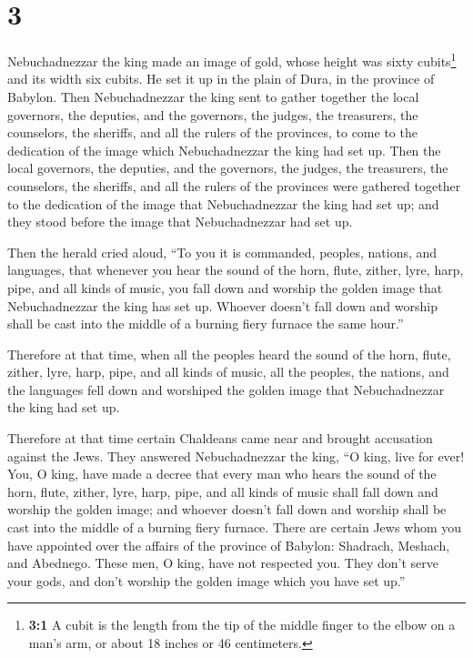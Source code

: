 \hypertarget{section-2}{%
\section{3}\label{section-2}}

 Nebuchadnezzar the king made an image of gold, whose
height was sixty cubits\footnote{\textbf{3:1} A cubit is the length from
  the tip of the middle finger to the elbow on a man's arm, or about 18
  inches or 46 centimeters.} and its width six cubits. He set it up in
the plain of Dura, in the province of Babylon.  Then
Nebuchadnezzar the king sent to gather together the local governors, the
deputies, and the governors, the judges, the treasurers, the counselors,
the sheriffs, and all the rulers of the provinces, to come to the
dedication of the image which Nebuchadnezzar the king had set up.
 Then the local governors, the deputies, and the
governors, the judges, the treasurers, the counselors, the sheriffs, and
all the rulers of the provinces were gathered together to the dedication
of the image that Nebuchadnezzar the king had set up; and they stood
before the image that Nebuchadnezzar had set up.

 Then the herald cried aloud, ``To you it is commanded,
peoples, nations, and languages,  that whenever you hear
the sound of the horn, flute, zither, lyre, harp, pipe, and all kinds of
music, you fall down and worship the golden image that Nebuchadnezzar
the king has set up.  Whoever doesn't fall down and
worship shall be cast into the middle of a burning fiery furnace the
same hour.''

 Therefore at that time, when all the peoples heard the
sound of the horn, flute, zither, lyre, harp, pipe, and all kinds of
music, all the peoples, the nations, and the languages fell down and
worshiped the golden image that Nebuchadnezzar the king had set up.

 Therefore at that time certain Chaldeans came near and
brought accusation against the Jews.  They answered
Nebuchadnezzar the king, ``O king, live for ever!  You, O
king, have made a decree that every man who hears the sound of the horn,
flute, zither, lyre, harp, pipe, and all kinds of music shall fall down
and worship the golden image;  and whoever doesn't fall
down and worship shall be cast into the middle of a burning fiery
furnace.  There are certain Jews whom you have appointed
over the affairs of the province of Babylon: Shadrach, Meshach, and
Abednego. These men, O king, have not respected you. They don't serve
your gods, and don't worship the golden image which you have set up.''

